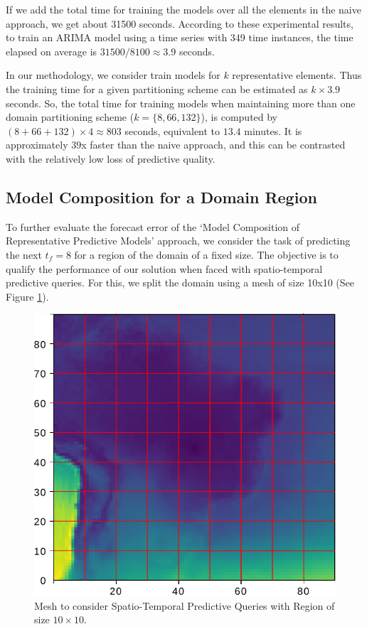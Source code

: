 If we add the total time for training the models over all the elements in the naive approach, we get about 31500 seconds. According to these experimental results, to train an ARIMA model using a time series with 349 time instances, the time elapsed on average is $31500 / 8100 \approx 3.9$ seconds. 

In our methodology, we consider train models for $k$ representative elements. Thus the training time for a given partitioning scheme can be estimated as $k \times 3.9$ seconds. So, the total time for training models when maintaining more than one domain partitioning scheme ($k = \{8, 66, 132\}$), is computed by $(8 + 66  + 132) \times 4 \approx 803$ seconds, equivalent to $13.4$ minutes. It is approximately $39$x faster than the naive approach, and this can be contrasted with the relatively low loss of predictive quality.

\subsection{Model Composition for a Domain Region}
\label{Sec:ModelCompositionAggregated}

To further evaluate the forecast error of the `Model Composition of Representative Predictive Models’ approach, we consider the task of predicting the next $t_{f}=8$ for a region of the domain of a fixed size. The objective is to qualify the performance of our solution when faced with spatio-temporal predictive queries. For this, we split the domain using a mesh of size 10x10 (See Figure \ref{Fig:Query_10x10_whole_real_brazil}).

\begin{figure}[ht]
	\centering
	\includegraphics[scale=0.75]{../Figures/query_10x10_whole_real_brazil}
	\caption{Mesh to consider Spatio-Temporal Predictive Queries with Region of size $10 \times 10$.}
	\label{Fig:Query_10x10_whole_real_brazil}
\end{figure}

